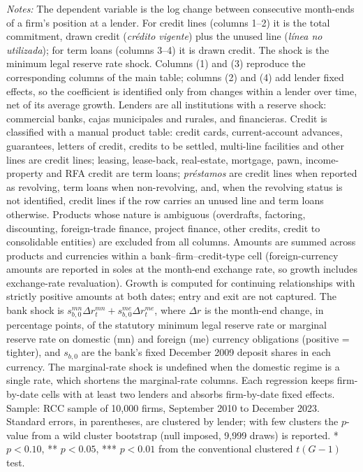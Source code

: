\begin{table}[!h]
\begin{threeparttable}[b]
      \begin{tablenotes}\item \textit{Notes:} The dependent variable is the log change between consecutive month-ends of a firm's position at a lender. For credit lines (columns 1--2) it is the total commitment, drawn credit (\textit{cr\'edito vigente}) plus the unused line (\textit{l\'inea no utilizada}); for term loans (columns 3--4) it is drawn credit. The shock is the minimum legal reserve rate shock. Columns (1) and (3) reproduce the corresponding columns of the main table; columns (2) and (4) add lender fixed effects, so the coefficient is identified only from changes within a lender over time, net of its average growth. Lenders are all institutions with a reserve shock: commercial banks, cajas municipales and rurales, and financieras. Credit is classified with a manual product table: credit cards, current-account advances, guarantees, letters of credit, credits to be settled, multi-line facilities and other lines are credit lines; leasing, lease-back, real-estate, mortgage, pawn, income-property and RFA credit are term loans; \textit{pr\'estamos} are credit lines when reported as revolving, term loans when non-revolving, and, when the revolving status is not identified, credit lines if the row carries an unused line and term loans otherwise. Products whose nature is ambiguous (overdrafts, factoring, discounting, foreign-trade finance, project finance, other credits, credit to consolidable entities) are excluded from all columns. Amounts are summed across products and currencies within a bank--firm--credit-type cell (foreign-currency amounts are reported in soles at the month-end exchange rate, so growth includes exchange-rate revaluation). Growth is computed for continuing relationships with strictly positive amounts at both dates; entry and exit are not captured. The bank shock is $s^{mn}_{b,0}\Delta r^{mn}_{t}+s^{me}_{b,0}\Delta r^{me}_{t}$, where $\Delta r$ is the month-end change, in percentage points, of the statutory minimum legal reserve rate or marginal reserve rate on domestic (mn) and foreign (me) currency obligations (positive = tighter), and $s_{b,0}$ are the bank's fixed December 2009 deposit shares in each currency. The marginal-rate shock is undefined when the domestic regime is a single rate, which shortens the marginal-rate columns. Each regression keeps firm-by-date cells with at least two lenders and absorbs firm-by-date fixed effects. Sample: RCC sample of 10,000 firms, September 2010 to December 2023. Standard errors, in parentheses, are clustered by lender; with few clusters the $p$-value from a wild cluster bootstrap (null imposed, 9,999 draws) is reported. * $p<0.10$, ** $p<0.05$, *** $p<0.01$ from the conventional clustered $t(G-1)$ test.
      \end{tablenotes}
   \end{threeparttable}
\end{table}


